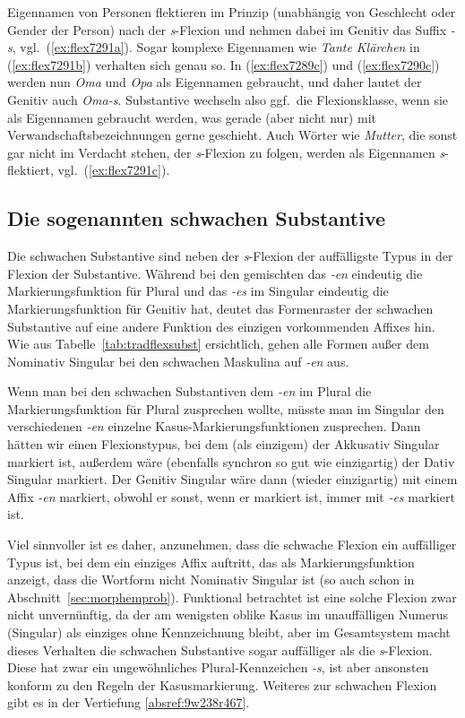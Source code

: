{Eigennamen von Personen flektieren im Prinzip (unabhängig von Geschlecht oder Gender der Person) nach der \textit{s}-Flexion und nehmen dabei im Genitiv das Suffix \textit{-s}, vgl.\ (\ref{ex:flex7291a}).
Sogar komplexe Eigennamen wie \textit{Tante Klärchen} in (\ref{ex:flex7291b}) verhalten sich genau so.
In (\ref{ex:flex7289c}) und (\ref{ex:flex7290c}) werden nun \textit{Oma} und \textit{Opa} als Eigennamen gebraucht, und daher lautet der Genitiv auch \textit{Oma-s}.
Substantive wechseln also ggf.\ die Flexionsklasse, wenn sie als Eigennamen gebraucht werden, was gerade (aber nicht nur) mit Verwandschaftsbezeichnungen gerne geschieht.
Auch Wörter wie \textit{Mutter}, die sonst gar nicht im Verdacht stehen, der \textit{s}-Flexion zu folgen, werden als Eigennamen \textit{s}-flektiert, vgl.\ (\ref{ex:flex7291c}).
}

\subsection{Die sogenannten schwachen Substantive}

\label{sec:schwachsubst}


Die schwachen Substantive sind neben der \textit{s}-Flexion der auffälligste Typus in der Flexion der Substantive.
Während bei den gemischten das \textit{-en} eindeutig die Markierungsfunktion für Plural und das \textit{-es} im Singular eindeutig die Markierungsfunktion für Genitiv hat, deutet das Formenraster der schwachen Substantive auf eine andere Funktion des einzigen vorkommenden Affixes hin.
Wie aus Tabelle~\ref{tab:tradflexsubst} ersichtlich, gehen alle Formen außer dem Nominativ Singular bei den schwachen Maskulina auf \textit{-en} aus.

Wenn man bei den schwachen Substantiven dem \textit{-en} im Plural die Markierungsfunktion für Plural zusprechen wollte, müsste man im Singular den verschiedenen \textit{-en} einzelne Kasus-Markierungsfunktionen zusprechen.
Dann hätten wir einen Flexionstypus, bei dem (als einzigem) der Akkusativ Singular markiert ist, außerdem wäre (ebenfalls synchron so gut wie einzigartig) der Dativ Singular markiert.
Der Genitiv Singular wäre dann (wieder einzigartig) mit einem Affix \textit{-en} markiert, obwohl er sonst, wenn er markiert ist, immer mit \textit{-es} markiert ist.

Viel sinnvoller ist es daher, anzunehmen, dass die schwache Flexion ein auffälliger Typus ist, bei dem ein einziges Affix auftritt, das als Markierungsfunktion anzeigt, dass die Wortform nicht Nominativ Singular ist (so auch schon in Abschnitt~\ref{sec:morphemprob}).
Funktional betrachtet ist eine solche Flexion zwar nicht unvernünftig, da der am wenigsten oblike Kasus im unauffälligen Numerus (Singular) als einziges ohne Kennzeichnung bleibt, aber im Gesamtsystem macht dieses Verhalten die schwachen Substantive sogar auffälliger als die \textit{s}-Flexion.
Diese hat zwar ein ungewöhnliches Plural-Kennzeichen \textit{-s}, ist aber ansonsten konform zu den Regeln der Kasusmarkierung.
Weiteres zur schwachen Flexion gibt es in der Vertiefung \ref{absref:9w238r467}.

